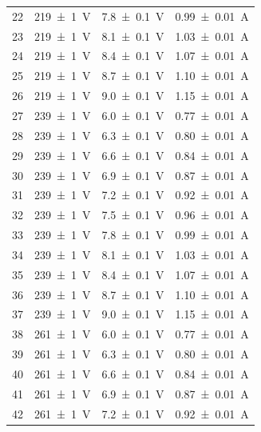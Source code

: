 \begin{table}[hb]
\begin{tabular}{|c|c|c|c|}
			22 & \SI{219 \pm 1}{\volt} &\SI{7.8 \pm 0.1}{\volt} & \SI{0.99 \pm 0.01}{\ampere}\\
			23 & \SI{219 \pm 1}{\volt} &\SI{8.1 \pm 0.1}{\volt} & \SI{1.03 \pm 0.01}{\ampere}\\
			24 & \SI{219 \pm 1}{\volt} &\SI{8.4 \pm 0.1}{\volt} & \SI{1.07 \pm 0.01}{\ampere}\\
			25 & \SI{219 \pm 1}{\volt} &\SI{8.7 \pm 0.1}{\volt} & \SI{1.10 \pm 0.01}{\ampere}\\
			26 & \SI{219 \pm 1}{\volt} &\SI{9.0 \pm 0.1}{\volt} & \SI{1.15 \pm 0.01}{\ampere}\\
			27 & \SI{239 \pm 1}{\volt} &\SI{6.0 \pm 0.1}{\volt} & \SI{0.77 \pm 0.01}{\ampere}\\
			28 & \SI{239 \pm 1}{\volt} &\SI{6.3 \pm 0.1}{\volt} & \SI{0.80 \pm 0.01}{\ampere}\\
			29 & \SI{239 \pm 1}{\volt} &\SI{6.6 \pm 0.1}{\volt} & \SI{0.84 \pm 0.01}{\ampere}\\
			30 & \SI{239 \pm 1}{\volt} &\SI{6.9 \pm 0.1}{\volt} & \SI{0.87 \pm 0.01}{\ampere}\\
			31 & \SI{239 \pm 1}{\volt} &\SI{7.2 \pm 0.1}{\volt} & \SI{0.92 \pm 0.01}{\ampere}\\
			32 & \SI{239 \pm 1}{\volt} &\SI{7.5 \pm 0.1}{\volt} & \SI{0.96 \pm 0.01}{\ampere}\\
			33 & \SI{239 \pm 1}{\volt} &\SI{7.8 \pm 0.1}{\volt} & \SI{0.99 \pm 0.01}{\ampere}\\
			34 & \SI{239 \pm 1}{\volt} &\SI{8.1 \pm 0.1}{\volt} & \SI{1.03 \pm 0.01}{\ampere}\\
			35 & \SI{239 \pm 1}{\volt} &\SI{8.4 \pm 0.1}{\volt} & \SI{1.07 \pm 0.01}{\ampere}\\
			36 & \SI{239 \pm 1}{\volt} &\SI{8.7 \pm 0.1}{\volt} & \SI{1.10 \pm 0.01}{\ampere}\\
			37 & \SI{239 \pm 1}{\volt} &\SI{9.0 \pm 0.1}{\volt} & \SI{1.15 \pm 0.01}{\ampere}\\
			38 & \SI{261 \pm 1}{\volt} &\SI{6.0 \pm 0.1}{\volt} & \SI{0.77 \pm 0.01}{\ampere}\\
			39 & \SI{261 \pm 1}{\volt} &\SI{6.3 \pm 0.1}{\volt} & \SI{0.80 \pm 0.01}{\ampere}\\
			40 & \SI{261 \pm 1}{\volt} &\SI{6.6 \pm 0.1}{\volt} & \SI{0.84 \pm 0.01}{\ampere}\\
			41 & \SI{261 \pm 1}{\volt} &\SI{6.9 \pm 0.1}{\volt} & \SI{0.87 \pm 0.01}{\ampere}\\
			42 & \SI{261 \pm 1}{\volt} &\SI{7.2 \pm 0.1}{\volt} & \SI{0.92 \pm 0.01}{\ampere}\\

\end{tabular}
\end{table}
